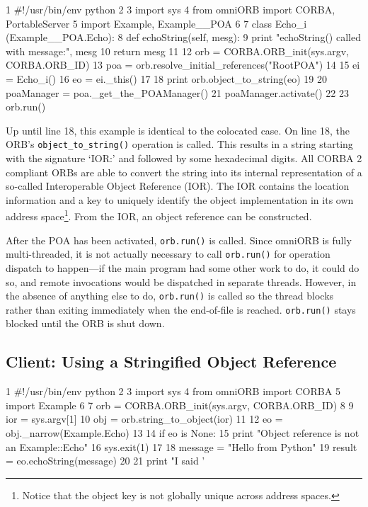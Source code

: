 \documentclass[11pt,oneside,a4paper]{book}
\newcommand{\op}[1]{\texttt{#1()}}
\begin{document}
\lstset{numbers=left,gobble=4}
\begin{pylisting}
 1  #!/usr/bin/env python
 2  
 3  import sys
 4  from omniORB import CORBA, PortableServer
 5  import Example, Example__POA
 6  
 7  class Echo_i (Example__POA.Echo):
 8      def echoString(self, mesg):
 9          print "echoString() called with message:", mesg
10          return mesg
11  
12  orb = CORBA.ORB_init(sys.argv, CORBA.ORB_ID)
13  poa = orb.resolve_initial_references("RootPOA")
14  
15  ei = Echo_i()
16  eo = ei._this()
17  
18  print orb.object_to_string(eo)
19  
20  poaManager = poa._get_the_POAManager()
21  poaManager.activate()
22  
23  orb.run()
\end{pylisting}
\lstset{numbers=none,gobble=0}

Up until line 18, this example is identical to the colocated case. On
line 18, the ORB's \op{object\_to\_string} operation is called. This
results in a string starting with the signature `IOR:' and followed by
some hexadecimal digits. All CORBA 2 compliant ORBs are able to
convert the string into its internal representation of a so-called
Interoperable Object Reference (IOR). The IOR contains the location
information and a key to uniquely identify the object implementation
in its own address space\footnote{Notice that the object key is not
globally unique across address spaces.}. From the IOR, an object
reference can be constructed.

After the POA has been activated, \op{orb.run} is called. Since
omniORB is fully multi-threaded, it is not actually necessary to call
\op{orb.run} for operation dispatch to happen---if the main program
had some other work to do, it could do so, and remote invocations
would be dispatched in separate threads. However, in the absence of
anything else to do, \op{orb.run} is called so the thread blocks
rather than exiting immediately when the end-of-file is reached.
\op{orb.run} stays blocked until the ORB is shut down.

\vspace{\baselineskip}%

\subsection{Client: Using a Stringified Object Reference}
\label{clnt2}

\lstset{numbers=left,gobble=4}
\begin{pylisting}
 1  #!/usr/bin/env python
 2  
 3  import sys
 4  from omniORB import CORBA
 5  import Example
 6  
 7  orb = CORBA.ORB_init(sys.argv, CORBA.ORB_ID)
 8  
 9  ior = sys.argv[1]
10  obj = orb.string_to_object(ior)
11  
12  eo = obj._narrow(Example.Echo)
13  
14  if eo is None:
15      print "Object reference is not an Example::Echo"
16      sys.exit(1)
17  
18  message = "Hello from Python"
19  result  = eo.echoString(message)
20  
21  print "I said '%
\end{pylisting}
\lstset{numbers=none,gobble=0}
\end{document}
